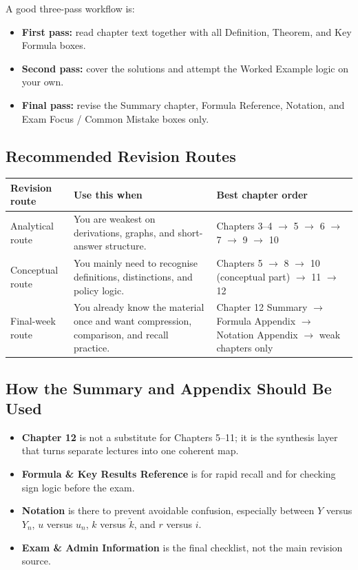 \documentclass[12pt]{article}
\begin{document}
A good three-pass workflow is:
\begin{itemize}[leftmargin=1.5em]
\item \textbf{First pass:} read chapter text together with all Definition, Theorem, and Key Formula boxes.
\item \textbf{Second pass:} cover the solutions and attempt the Worked Example logic on your own.
\item \textbf{Final pass:} revise the Summary chapter, Formula Reference, Notation, and Exam Focus / Common Mistake boxes only.
\end{itemize}

\subsection*{Recommended Revision Routes}

\begin{center}
\renewcommand{\arraystretch}{1.25}
\begin{tabularx}{\textwidth}{|p{2.8cm}|X|X|}
\hline
\textbf{Revision route} & \textbf{Use this when} & \textbf{Best chapter order} \\
\hline
Analytical route & You are weakest on derivations, graphs, and short-answer structure. & Chapters 3--4 \(\rightarrow\) 5 \(\rightarrow\) 6 \(\rightarrow\) 7 \(\rightarrow\) 9 \(\rightarrow\) 10 \\
\hline
Conceptual route & You mainly need to recognise definitions, distinctions, and policy logic. & Chapters 5 \(\rightarrow\) 8 \(\rightarrow\) 10 (conceptual part) \(\rightarrow\) 11 \(\rightarrow\) 12 \\
\hline
Final-week route & You already know the material once and want compression, comparison, and recall practice. & Chapter 12 Summary \(\rightarrow\) Formula Appendix \(\rightarrow\) Notation Appendix \(\rightarrow\) weak chapters only \\
\hline
\end{tabularx}
\end{center}

\subsection*{How the Summary and Appendix Should Be Used}

\begin{itemize}[leftmargin=1.5em]
\item \textbf{Chapter 12} is not a substitute for Chapters 5--11; it is the synthesis layer that turns separate lectures into one coherent map.
\item \textbf{Formula \& Key Results Reference} is for rapid recall and for checking sign logic before the exam.
\item \textbf{Notation} is there to prevent avoidable confusion, especially between $Y$ versus $Y_n$, $u$ versus $u_n$, $k$ versus $\tilde{k}$, and $r$ versus $i$.
\item \textbf{Exam \& Admin Information} is the final checklist, not the main revision source.
\end{itemize}
\end{document}
